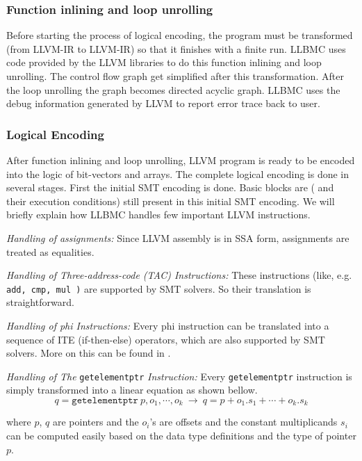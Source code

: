 \documentclass[14pt]{article}
\begin{document}
{\subsubsection*{Function inlining and loop unrolling} 
Before starting the process of logical encoding, the program must be transformed (from LLVM-IR to LLVM-IR) so that it finishes with a finite run. LLBMC uses code provided by the LLVM libraries to do this function inlining and loop unrolling. The control flow graph get simplified after this transformation. After the loop unrolling the graph becomes directed acyclic graph. LLBMC uses the debug information generated by LLVM to report error trace back to user.

\subsubsection*{Logical Encoding}\label{Logical Encoding}
After function inlining and loop unrolling, LLVM program is ready to be encoded into the logic of bit-vectors and arrays. The complete logical encoding is done in several stages. First the initial SMT encoding is done. Basic blocks are ( and their execution conditions) still present in this initial SMT encoding. We will briefly explain how LLBMC handles few important LLVM instructions.
\par \textit{Handling of assignments:} Since LLVM assembly is in SSA form, assignments are treated as equalities.
\par \textit{Handling of Three-address-code (TAC) Instructions:}  These instructions (like, e.g. \texttt{add, cmp, mul )} are supported by SMT solvers. So their translation is straightforward.
\par \textit{Handling of phi Instructions:} Every phi instruction can be translated into a sequence of ITE (if-then-else) operators, which are also supported by SMT solvers. More on this can be found in \cite{llbmc2}.
\par \textit{Handling of The }\texttt{getelementptr}  \textit{Instruction:} Every \texttt{getelementptr}  instruction is simply transformed into a linear equation as shown bellow.
\[q = \texttt{getelementptr} \  p, o_1, \cdots , o_k \   \rightarrow  \   q = p + o_1 . s_1 + \cdots  + o_k .s_k \] 

where \(p\), \(q\) are pointers and the \(o_i\)'s are offsets and the constant multiplicands \(s_i\) can be computed easily based on the
data type definitions and the type of pointer \(p\).

}
\end{document}
